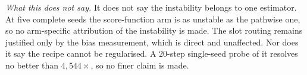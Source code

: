 \emph{What this does not say.} It does not say the instability belongs to one estimator.  At five
complete seeds the score-function arm is as unstable as the pathwise one, so no
arm-specific attribution of the instability is made.  The slot routing remains justified only by the bias
measurement, which is direct and unaffected. Nor does it say the recipe cannot be regularised.  A $20$-step single-seed probe of
it resolves no better than $4{,}544\times$, so no finer claim is made.

\FloatBarrier

